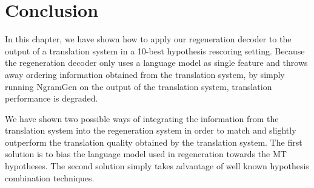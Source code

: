 \section{Conclusion}

In this chapter, we have shown how to apply our regeneration
decoder to the output of a translation system in a 10-best hypothesis
rescoring setting. Because the regeneration decoder only uses
a language model as single feature and throws away ordering
information obtained from the translation system, by simply
running NgramGen on the output of the translation system, translation
performance is degraded.

We have shown two possible ways of integrating the information from the
translation system into the regeneration system in order to match
and slightly outperform the translation quality obtained by the
translation system. The first solution is to bias the language
model used in regeneration towards the MT hypotheses. The second
solution simply takes advantage of well known hypothesis combination
techniques.

